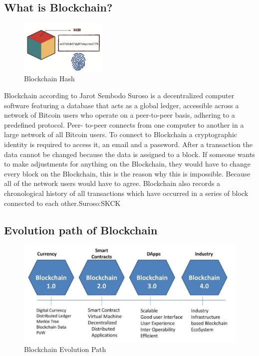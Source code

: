 \documentclass[10pt,english,a4paper]{article}
\begin{document}
\subsection{What is Blockchain?}
\begin{figure}
  \centering
  \includegraphics[width=0.37\textwidth]{Blockchain-hash.png} 
  \caption{Blockchain Hash\cite{Jain:Criminal:record}}
\end{figure} 
Blockchain according to Jarot Sembodo Suroso\cite{Suroso:SKCK} is a decentralized computer software featuring a database that acts as a global ledger, accessible across a network of Bitcoin users who operate on a peer-to-peer basis, adhering to a predefined protocol. Peer- to-peer connects from one computer to another in a large network of all Bitcoin users. To connect to Blockchain a cryptographic identity is required to access it, an email and a password. After a transaction the data cannot be changed because the data is assigned to a block. If someone wants to make adjustments for anything on the Blockchain, they would have to change every block on the Blockchain, this is  the reason why this is impossible. Because all of the network users would have to agree. Blockchain also records a chronological history of all transactions which have occurred in a series of block connected to each other.{Suroso:SKCK}

\subsection{Evolution path of Blockchain}
\begin{figure}[h]
    \centering
    \includegraphics[scale=0.4]{Blockchain-evolution.png}
    \caption{Blockchain Evolution Path \cite{Suroso:SKCK}}
    \label{histogram}
\end{figure}
\end{document}
